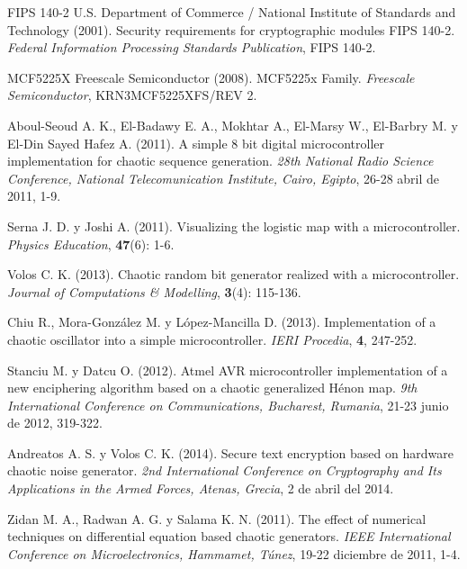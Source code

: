 \begin{thebibliography}{00}
FIPS 140-2 U.S. Department of Commerce / National Institute of Standards and Technology (2001).
\newblock Security requirements for cryptographic modules FIPS 140-2.
\newblock \emph{Federal Information Processing Standards Publication}, FIPS 140-2.

MCF5225X Freescale Semiconductor (2008).
\newblock MCF5225x Family.
\newblock \emph{Freescale Semiconductor}, KRN3MCF5225XFS/REV 2.

Aboul-Seoud A. K., El-Badawy E. A., Mokhtar A., El-Marsy W., El-Barbry M. y El-Din Sayed Hafez A. (2011).
\newblock A simple 8 bit digital microcontroller implementation for chaotic sequence generation.
\newblock \emph{28th National Radio Science Conference, National Telecomunication Institute, Cairo, Egipto}, 26-28 abril de 2011, 1-9.

Serna J. D. y Joshi A. (2011).
\newblock Visualizing the logistic map with a microcontroller.
\newblock \emph{Physics Education}, \textbf{47}(6): 1-6.

Volos C. K. (2013).
\newblock Chaotic random bit generator realized with a microcontroller.
\newblock \emph{Journal of Computations \& Modelling}, \textbf{3}(4): 115-136.

Chiu R., Mora-González M. y López-Mancilla D. (2013).
\newblock Implementation of a chaotic oscillator into a simple microcontroller.
\newblock \emph{IERI Procedia}, \textbf{4}, 247-252.

Stanciu M. y Datcu O. (2012).
\newblock Atmel AVR microcontroller implementation of a new enciphering algorithm based on a chaotic generalized Hénon map.
\newblock \emph{9th International Conference on Communications, Bucharest, Rumania}, 21-23 junio de 2012, 319-322.

Andreatos A. S. y Volos C. K. (2014).
\newblock Secure text encryption based on hardware chaotic noise generator.
\newblock \emph{2nd International Conference on Cryptography and Its Applications in the Armed Forces, Atenas, Grecia}, 2 de abril del 2014.

Zidan M. A., Radwan A. G. y Salama K. N. (2011).
\newblock The effect of numerical techniques on differential equation based chaotic generators.
\newblock \emph{IEEE International Conference on Microelectronics, Hammamet, Túnez}, 19-22 diciembre de 2011, 1-4.


\end{thebibliography}
